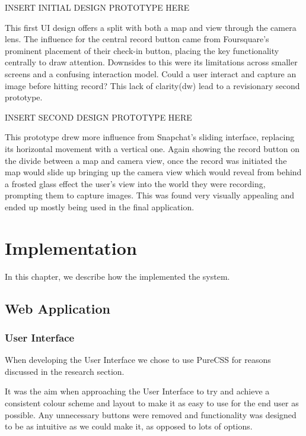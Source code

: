 \documentclass{l3proj}
\begin{document}
INSERT INITIAL DESIGN PROTOTYPE HERE

This first UI design offers a split with both a map and view through the camera
lens. The influence for the central record button came from Foursquare’s
prominent placement of their check-in button, placing the key functionality
centrally to draw attention. Downsides to this were its limitations across
smaller screens and a confusing interaction model. Could a user interact and
capture an image before hitting record? This lack of clarity(dw) lead to a
revisionary second prototype.

INSERT SECOND DESIGN PROTOTYPE HERE

This prototype drew more influence from Snapchat’s sliding interface, replacing
its horizontal movement with a vertical one. Again showing the record button on
the divide between a map and camera view, once the record was initiated the map
would slide up bringing up the camera view which would reveal from behind a
frosted glass effect the user’s view into the world they were recording,
prompting them to capture images. This was found very visually appealing and
ended up mostly being used in the final application.


\chapter{Implementation}
\label{impl}

In this chapter, we describe how the implemented the system.

\section{Web Application}


\subsection{User Interface}

When developing the User Interface we chose to use PureCSS for reasons
discussed in the research section.

It was the aim when approaching the User Interface to try and achieve
a consistent colour scheme and layout to make it as easy to use for
the end user as possible. Any unnecessary buttons were removed and
functionality was designed to be as intuitive as we could make it, as
opposed to lots of options.
\end{document}
